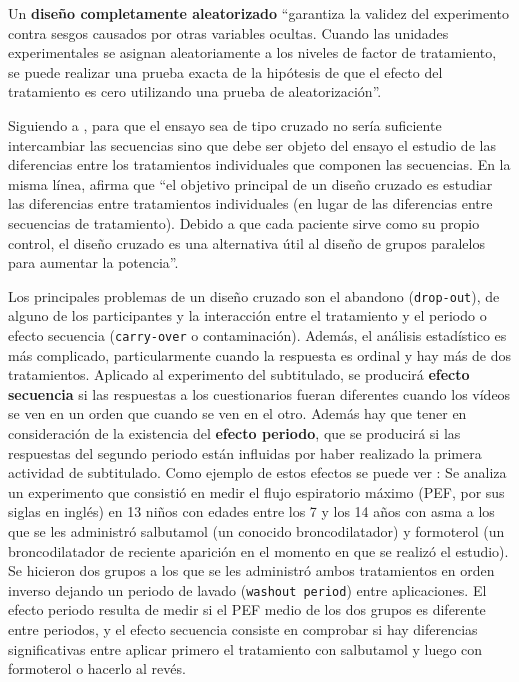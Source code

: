 \documentclass[
  12pt,
  a4paper,
  extrafontsizes,
  onecolumn,
  openright,
  table]{memoir}
\begin{document}
Un \textbf{\gls{diseño completamente aleatorizado}}
\autocite[pp.~18]{lawson2015} \enquote{garantiza la validez del
experimento contra sesgos causados por otras variables ocultas. Cuando
las unidades experimentales se asignan aleatoriamente a los niveles de
factor de tratamiento, se puede realizar una prueba exacta de la
hipótesis de que el efecto del tratamiento es cero utilizando una prueba
de aleatorización}.

Siguiendo a \textcite[pp.~5-9]{senn2022}, para que el ensayo sea de tipo
cruzado no sería suficiente intercambiar las secuencias sino que debe
ser objeto del ensayo el estudio de las diferencias entre los
tratamientos individuales que componen las secuencias. En la misma
línea, \textcite[pp.~1-2]{lui2016} afirma que \enquote{el objetivo
principal de un diseño cruzado es estudiar las diferencias entre
tratamientos individuales (en lugar de las diferencias entre secuencias
de tratamiento). Debido a que cada paciente sirve como su propio
control, el diseño cruzado es una alternativa útil al diseño de grupos
paralelos para aumentar la potencia}.

Los principales problemas de un diseño cruzado son el abandono
(\texttt{drop-out}), de alguno de los participantes y la interacción
entre el tratamiento y el periodo o efecto secuencia
(\texttt{carry-over} o contaminación). Además, el análisis estadístico
es más complicado, particularmente cuando la respuesta es ordinal y hay
más de dos tratamientos. Aplicado al experimento del subtitulado, se
producirá \textbf{efecto secuencia} si las respuestas a los
cuestionarios fueran diferentes cuando los vídeos se ven en un orden que
cuando se ven en el otro. Además hay que tener en consideración de la
existencia del \textbf{efecto periodo}, que se producirá si las
respuestas del segundo periodo están influidas por haber realizado la
primera actividad de subtitulado. Como ejemplo de estos efectos se puede
ver \textcite[pp.~35-53]{senn2022}: Se analiza un experimento que
consistió en medir el flujo espiratorio máximo (PEF, por sus siglas en
inglés) en 13 niños con edades entre los 7 y los 14 años con asma a los
que se les administró salbutamol (un conocido broncodilatador) y
formoterol (un broncodilatador de reciente aparición en el momento en
que se realizó el estudio). Se hicieron dos grupos a los que se les
administró ambos tratamientos en orden inverso dejando un periodo de
lavado (\texttt{washout\ period}) entre aplicaciones. El
\gls{efecto periodo} resulta de medir si el PEF medio de los dos grupos
es diferente entre periodos, y el \gls{efecto secuencia} consiste en
comprobar si hay diferencias significativas entre aplicar primero el
tratamiento con salbutamol y luego con formoterol o hacerlo al revés.
\end{document}
